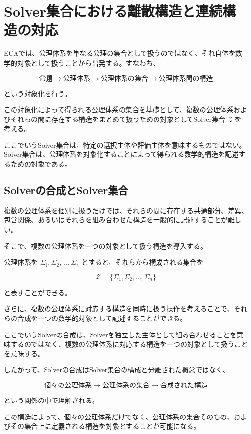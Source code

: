 \section{Solver集合における離散構造と連続構造の対応}

ECAでは、公理体系を単なる公理の集合として扱うのではなく、それ自体を数学的対象として扱うことから出発する。すなわち、

\[
\text{命題}
\longrightarrow
\text{公理体系}
\longrightarrow
\text{公理体系の集合}
\longrightarrow
\text{公理体系間の構造}
\]

という対象化を行う。

この対象化によって得られる公理体系の集合を基礎として、複数の公理体系およびそれらの間に存在する構造をまとめて扱うための対象としてSolver集合 $\mathcal{Z}$ を考える。

ここでいうSolver集合は、特定の選択主体や評価主体を意味するものではない。Solver集合は、公理体系を対象化することによって得られる数学的構造を記述するための対象である。

\subsection{Solverの合成とSolver集合}

複数の公理体系を個別に扱うだけでは、それらの間に存在する共通部分、差異、包含関係、あるいはそれらを組み合わせた構造を一般的に記述することが難しい。

そこで、複数の公理体系を一つの対象として扱う構造を導入する。

公理体系を $\Sigma_1,\Sigma_2,\ldots,\Sigma_n$ とすると、それらから構成される集合を

\[
\mathcal{Z}
=
\{\Sigma_1,\Sigma_2,\ldots,\Sigma_n\}
\]

と表すことができる。

さらに、複数の公理体系に対応する構造を同時に扱う操作を考えることで、それらの合成を一つの数学的対象として記述することができる。

ここでいうSolverの合成は、Solverを独立した主体として組み合わせることを意味するのではなく、複数の公理体系に対応する構造を一つの対象として扱うことを意味する。

したがって、Solverの合成はSolver集合の構成と分離された概念ではなく、

\[
\text{個々の公理体系}
\longrightarrow
\text{公理体系の集合}
\longrightarrow
\text{合成された構造}
\]

という関係の中で理解される。

この構造によって、個々の公理体系だけでなく、公理体系の集合そのもの、およびその集合上に定義される構造を対象とすることが可能になる。

